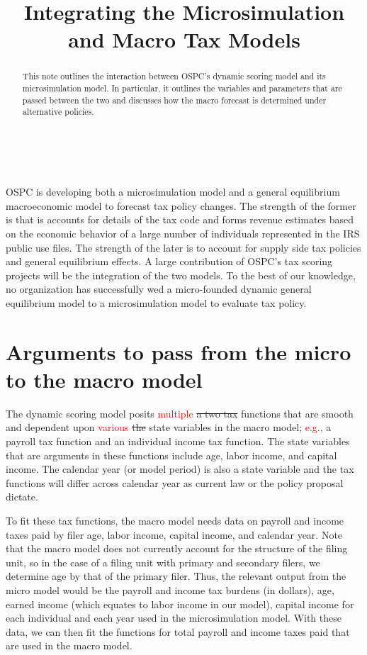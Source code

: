 \documentclass[letterpaper,11pt]{article}
\theoremstyle{definition}
\begin{document}
\title{Integrating the Microsimulation and Macro Tax Models}
\maketitle

\begin{abstract}
\small{This note outlines the interaction between OSPC's dynamic scoring model and its microsimulation model.  In particular, it outlines the variables and parameters that are passed between the two and discusses how the macro forecast is determined under alternative policies.}
\end{abstract}

\ \\
\ \\

OSPC is developing both a microsimulation model and a general equilibrium macroeconomic model to forecast tax policy changes.  The strength of the former is that is accounts for details of the tax code and forms revenue estimates based on the economic behavior of a large number of individuals represented in the IRS public use files.  The strength of the later is to account for supply side tax policies and general equilibrium effects.  A large contribution of OSPC's tax scoring projects will be the integration of the two models.  To the best of our knowledge, no organization has successfully wed a micro-founded dynamic general equilibrium model to a microsimulation model to evaluate tax policy.

\section{Arguments to pass from the micro to the macro model}

The dynamic scoring model posits \textcolor{red}{multiple} \st{a two tax} functions that are smooth and dependent upon \textcolor{red}{various} \st{the} state variables in the macro model; \textcolor{red}{e.g.,} a payroll tax function and an individual income tax function. The state variables that are arguments in these functions include age, labor income, and capital income. The calendar year (or model period) is also a state variable and the tax functions will differ across calendar year as current law or the policy proposal dictate.

To fit these tax functions, the macro model needs data on payroll and income taxes paid by filer age, labor income, capital income, and calendar year. Note that the macro model does not currently account for the structure of the filing unit, so in the case of a filing unit with primary and secondary filers, we determine age by that of the primary filer. Thus, the relevant output from the micro model would be the payroll and income tax burdens (in dollars), age, earned income (which equates to labor income in our model), capital income for each individual and each year used in the microsimulation model. With these data, we can then fit the functions for total payroll and income taxes paid that are used in the macro model.
\end{document}
